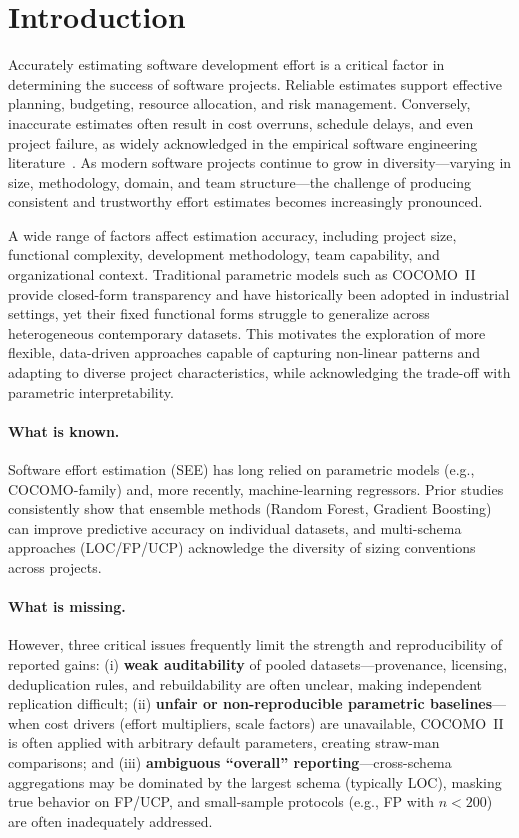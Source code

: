 \documentclass{ieeeaccess}
\begin{document}
\section{Introduction}

Accurately estimating software development effort is a critical factor in determining the success of software projects. Reliable estimates support effective planning, budgeting, resource allocation, and risk management. Conversely, inaccurate estimates often result in cost overruns, schedule delays, and even project failure, as widely acknowledged in the empirical software engineering literature~\cite{boehm2000cocomo}. As modern software projects continue to grow in diversity---varying in size, methodology, domain, and team structure---the challenge of producing consistent and trustworthy effort estimates becomes increasingly pronounced.

A wide range of factors affect estimation accuracy, including project size, functional complexity, development methodology, team capability, and organizational context. Traditional parametric models such as COCOMO~II provide closed-form transparency and have historically been adopted in industrial settings, yet their fixed functional forms struggle to generalize across heterogeneous contemporary datasets. This motivates the exploration of more flexible, data-driven approaches capable of capturing non-linear patterns and adapting to diverse project characteristics, while acknowledging the trade-off with parametric interpretability.

\paragraph{What is known.}
Software effort estimation (SEE) has long relied on parametric models (e.g., COCOMO-family) and, more recently, machine-learning regressors. Prior studies consistently show that ensemble methods (Random Forest, Gradient Boosting) can improve predictive accuracy on individual datasets, and multi-schema approaches (LOC/FP/UCP) acknowledge the diversity of sizing conventions across projects.

\paragraph{What is missing.}
However, three critical issues frequently limit the strength and reproducibility of reported gains: 
(i) \textbf{weak auditability} of pooled datasets---provenance, licensing, deduplication rules, and rebuildability are often unclear, making independent replication difficult; 
(ii) \textbf{unfair or non-reproducible parametric baselines}---when cost drivers (effort multipliers, scale factors) are unavailable, COCOMO~II is often applied with arbitrary default parameters, creating straw-man comparisons; and 
(iii) \textbf{ambiguous ``overall'' reporting}---cross-schema aggregations may be dominated by the largest schema (typically LOC), masking true behavior on FP/UCP, and small-sample protocols (e.g., FP with $n<200$) are often inadequately addressed.
\end{document}

